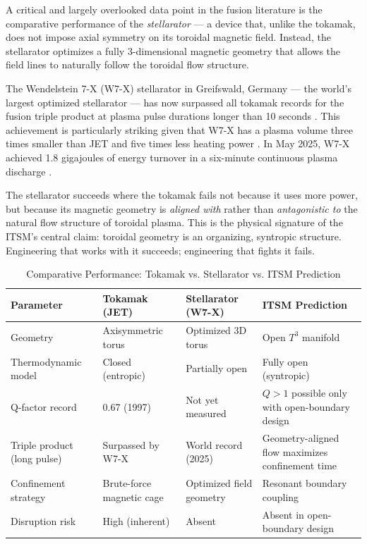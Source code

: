 \documentclass[aps,prd,11pt,onecolumn,superscriptaddress,nofootinbib,floatfix]{revtex4-2}
\begin{document}
A critical and largely overlooked data point in the fusion literature is the comparative performance of the \textit{stellarator} --- a device that, unlike the tokamak, does not impose axial symmetry on its toroidal magnetic field. Instead, the stellarator optimizes a fully 3-dimensional magnetic geometry that allows the field lines to naturally follow the toroidal flow structure.

The Wendelstein 7-X (W7-X) stellarator in Greifswald, Germany --- the world's largest optimized stellarator --- has now surpassed all tokamak records for the fusion triple product at plasma pulse durations longer than 10 seconds \cite{w7x_2025}. This achievement is particularly striking given that W7-X has a plasma volume three times smaller than JET and five times less heating power \cite{w7x_pppl}. In May 2025, W7-X achieved 1.8 gigajoules of energy turnover in a six-minute continuous plasma discharge \cite{w7x_2025}.

The stellarator succeeds where the tokamak fails not because it uses more power, but because its magnetic geometry is \textit{aligned with} rather than \textit{antagonistic to} the natural flow structure of toroidal plasma. This is the physical signature of the ITSM's central claim: toroidal geometry is an organizing, syntropic structure. Engineering that works with it succeeds; engineering that fights it fails.

\begin{table}[h]
\centering
\caption{Comparative Performance: Tokamak vs. Stellarator vs. ITSM Prediction}
\label{tab:fusion_comparison}
\begin{tabular}{p{} p{} p{} p{}}
\toprule
\textbf{Parameter} & \textbf{Tokamak (JET)} & \textbf{Stellarator (W7-X)} & \textbf{ITSM Prediction} \\
\midrule
Geometry & Axisymmetric torus & Optimized 3D torus & Open $T^3$ manifold \\
Thermodynamic model & Closed (entropic) & Partially open & Fully open (syntropic) \\
Q-factor record & 0.67 (1997) & Not yet measured & $Q > 1$ possible only with open-boundary design \\
Triple product (long pulse) & Surpassed by W7-X & World record (2025) & Geometry-aligned flow maximizes confinement time \\
Confinement strategy & Brute-force magnetic cage & Optimized field geometry & Resonant boundary coupling \\
Disruption risk & High (inherent) & Absent & Absent in open-boundary design \\
\bottomrule
\end{tabular}
\end{table}
\end{document}
